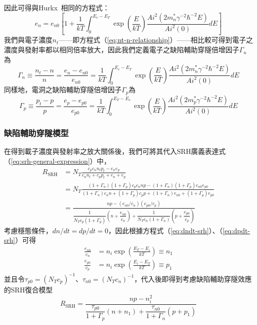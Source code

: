 因此可得與Hurkx~\cite{Hurkx:2004wr}相同的方程式：
\begin{equation}
e_n=e_{n0}\left[1+\frac{1}{kT}\int_0^{E_c-E_T}\exp\left(\frac{E}{kT}\right)\frac{Ai^2(2m_n^*\gamma^{-2}\hbar^{-2}E)}{Ai^2(0)}dE\right]
\end{equation}
我們與電子濃度$n_t$——即方程式（\ref{eq:nt-n-relationship}）——相比較可得到電子之濃度與發射率都以相同倍率放大，因此我們定義電子之缺陷輔助穿隧倍增因子$\Gamma_n$為
\begin{equation}
\label{eq:gamma_n_TAT}
\Gamma_n\equiv\frac{n_t-n}{n}=\frac{e_n-e_{n0}}{e_{n0}}=\frac{1}{kT}\int_0^{E_c-E_T}\exp\left(\frac{E}{kT}\right)\frac{Ai^2(2m_n^*\gamma^{-2}\hbar^{-2}E)}{Ai^2(0)}dE
\end{equation}
同樣地，電洞之缺陷輔助穿隧倍增因子$\Gamma_p$為
\begin{equation}
\label{eq:gamma_p_TAT}
\Gamma_p\equiv\frac{p_t-p}{p}=\frac{e_p-e_{p0}}{e_{p0}}=\frac{1}{kT}\int_0^{E_T-E_v}\exp\left(\frac{E}{kT}\right)\frac{Ai^2(2m_p^*\gamma^{-2}\hbar^{-2}E)}{Ai^2(0)}dE
\end{equation}
\subsubsection{缺陷輔助穿隧模型}
在得到載子濃度與發射率之放大關係後，我們可將其代入SRH廣義表達式（\ref{eq:srh-general-expression}）中，
\begin{equation}
\begin{aligned}
R_\text{SRH}&=N_T\frac{c_pc_nn_tp_t-e_ne_p}{c_nn_t+c_pp_t+e_n+e_p}\\[5pt]
&=N_T\frac{(1+\Gamma_n)(1+\Gamma_p)c_pc_nnp-(1+\Gamma_n)(1+\Gamma_p)e_{n0}e_{p0}}{(1+\Gamma_n)c_nn+(1+\Gamma_p)c_pp+(1+\Gamma_n)e_{n0}+(1+\Gamma_p)e_{p0}}\\[5pt]
&=\frac{np-(e_{n0}/c_n)(e_{p0}/c_p)}{\dfrac{1}{N_Tc_p(1+\Gamma_p)}\left(n+\dfrac{e_{n0}}{c_n}\right)+\dfrac{1}{N_Tc_n(1+\Gamma_n)}\left(p+\dfrac{e_{p0}}{c_p}\right)}
\end{aligned}
\end{equation}
考慮穩態條件，$dn/dt=dp/dt=0$，因此根據方程式（\ref{eq:dndt-srh}）、（\ref{eq:dpdt-srh}）可得
\begin{equation}
\begin{aligned}
\frac{e_{n0}}{c_n}&=n_i\exp\left(\frac{E_T-E_i}{kT}\right)\equiv n_1\\[5pt]
\frac{e_{p0}}{c_p}&=n_i\exp\left(\frac{E_i-E_T}{kT}\right)\equiv p_1
\end{aligned}
\end{equation}
並且令$\tau_{p0}=(N_Tc_p)^{-1}$、$\tau_{n0}=(N_Tc_n)^{-1}$，代入後即得到考慮缺陷輔助穿隧效應的SRH復合模型
\begin{equation}
\label{eq:TAT-SRH-recombination-model}
R_\text{SRH}=\frac{np-n_i^2}{\dfrac{\tau_{p0}}{1+\Gamma_p}\left(n+n_1\right)+\dfrac{\tau_{n0}}{1+\Gamma_n}\left(p+p_1\right)}
\end{equation}
